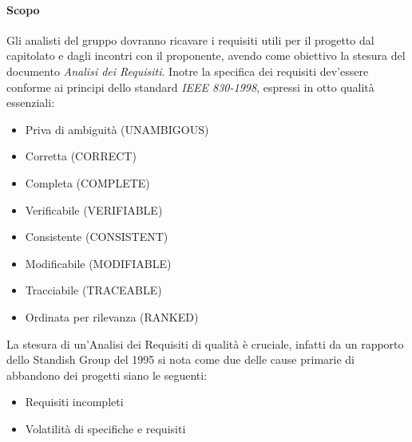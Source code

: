 			\paragraph*{Scopo}
				Gli analisti del gruppo dovranno ricavare i requisiti utili per il progetto
				dal capitolato e dagli incontri con il proponente, avendo come obiettivo la
				stesura del documento \textit{Analisi dei Requisiti}.
			        Inotre la specifica dei requisiti dev'essere conforme ai principi dello standard \textit{IEEE 830-1998}, espressi in otto qualit\`a
			        essenziali:
				\begin{itemize}
				\item Priva di ambiguit\`a (UNAMBIGOUS)
				\item Corretta (CORRECT)
				\item Completa (COMPLETE)
				\item Verificabile (VERIFIABLE)
				\item Consistente (CONSISTENT)
				\item Modificabile (MODIFIABLE)
				\item Tracciabile (TRACEABLE)
				\item Ordinata per rilevanza (RANKED)
				\end{itemize}
			        La stesura di un'Analisi dei Requisiti di qualit\`a \`e cruciale, infatti
			        da un rapporto dello Standish Group del 1995 si nota come due delle cause primarie
			        di abbandono dei progetti siano le seguenti:
				\begin{itemize}
				\item Requisiti incompleti
				\item Volatilità di specifiche e requisiti
				\end{itemize}
			
			
